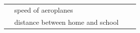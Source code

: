 {{\begin{center}
\begin{xtabular}[t]{|l|l|l|l|}
         &
    
    
        speed of aeroplanes &
    
    
         &
    
    
     \tabularnewline{}
    
    
         &
    
    
        distance between home and school &
    
    
         &
    
    
     \tabularnewline{}
    
    

\end{xtabular}
\end{center}}}
